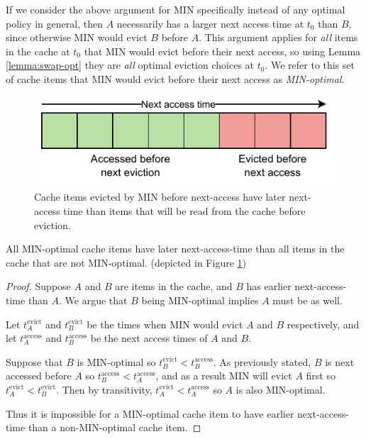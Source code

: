 If we consider the above argument for MIN specifically instead of any optimal policy in general, then $A$ necessarily has a larger next access time at $t_0$ than $B$, since otherwise MIN would evict $B$ before $A$. This argument applies for \textit{all} items in the cache at $t_0$ that MIN would evict before their next access, so using Lemma \ref{lemma:swap-opt} they are \textit{all} optimal eviction choices at $t_0$. We refer to this set of cache items that MIN would evict before their next access as \textit{MIN-optimal}.


\begin{figure}
    \centering
    \includegraphics{figures/Diagrams/diagrams-belady-boundary.pdf}
    \caption{Cache items evicted by MIN before next-access have later next-access time than items that will be read from the cache before eviction.}
    \label{fig:belady-boundary}
\end{figure}


\begin{claim}
\label{lemma:opt-greater-next-access}
All MIN-optimal cache items have later next-access-time than all items in the cache that are not MIN-optimal. (depicted in Figure \ref{fig:belady-boundary})
\end{claim}

\begin{proof}

Suppose $A$ and $B$ are items in the cache, and $B$ has earlier next-access-time than $A$. We argue that $B$ being MIN-optimal implies $A$ must be as well.

Let $t^\text{evict}_A$ and $t^\text{evict}_B$ be the times when MIN would evict $A$ and $B$ respectively, and let $t^\text{access}_A$ and $t^\text{access}_B$ be the next access times of $A$ and $B$.

Suppose that $B$ is MIN-optimal so $t^\text{evict}_B < t^\text{access}_B$. As previously stated, $B$ is next accessed before $A$ so $t^\text{access}_B < t^\text{access}_A$, and as a result MIN will evict $A$ first so $t^\text{evict}_A < t^\text{evict}_B$. Then by transitivity, $t^\text{evict}_A < t^\text{access}_A$ so $A$ is also MIN-optimal.

Thus it is impossible for a MIN-optimal cache item to have earlier next-access-time than a non-MIN-optimal cache item.
\end{proof}


